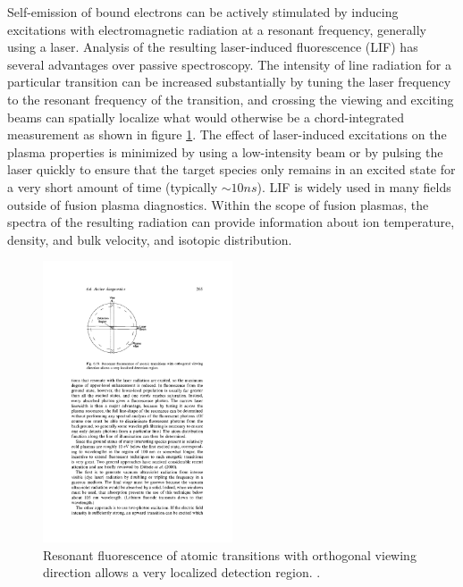 \documentclass{jpp}
\begin{document}
Self-emission of bound electrons can be actively stimulated by inducing excitations with electromagnetic radiation at a resonant frequency, generally using a laser. Analysis of the resulting laser-induced fluorescence (LIF) has several advantages over passive spectroscopy. The intensity of line radiation for a particular transition can be increased substantially by tuning the laser frequency to the resonant frequency of the transition, and crossing the viewing and exciting beams can spatially localize what would otherwise be a chord-integrated measurement as shown in figure \ref{fig:lif}. The effect of laser-induced excitations on the plasma properties is minimized by using a low-intensity beam or by pulsing the laser quickly to ensure that the target species only remains in an excited state for a very short amount of time (typically $\sim 10ns$). LIF is widely used in many fields outside of fusion plasma diagnostics. Within the scope of fusion plasmas, the spectra of the resulting radiation can provide information about ion temperature, density, and bulk velocity, and isotopic distribution.
\begin{figure}
  \centering
  \includegraphics[width=0.5\textwidth]{lif-localized-region.pdf}
  \caption{Resonant fluorescence of atomic transitions with orthogonal viewing direction allows a very localized detection region. \citep{Hutchinson_2002}.}
\label{fig:lif}
\end{figure}
\end{document}

